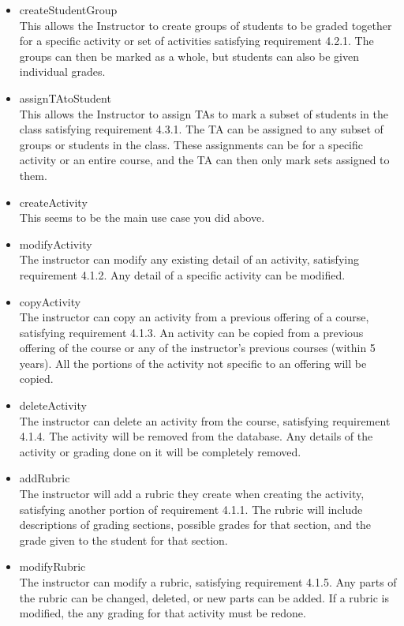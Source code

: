 \documentclass{article}
\begin{document}
\begin{itemize}
\item createStudentGroup \hfill \\
This allows the Instructor to create groups of students to be graded together for a specific activity or set of activities satisfying requirement 4.2.1. The groups can then be marked as a whole, but students can also be given individual grades.
\item assignTAtoStudent \hfill \\
This allows the Instructor to assign TAs to mark a subset of students in the class satisfying requirement 4.3.1. The TA can be assigned to any subset of groups or students in the class. These assignments can be for a specific activity or an entire course, and the TA can then only mark sets assigned to them.
\item createActivity \hfill \\
This seems to be the main use case you did above.
\item modifyActivity \hfill \\
The instructor can modify any existing detail of an activity, satisfying requirement 4.1.2. Any detail of a specific activity can be modified.
\item copyActivity \hfill \\
The instructor can copy an activity from a previous offering of a course, satisfying requirement 4.1.3. An activity can be copied from a previous offering of the course or any of the instructor’s previous courses (within 5 years). All the portions of the activity not specific to an offering will be copied.
\item deleteActivity \hfill \\
The instructor can delete an activity from the course, satisfying requirement 4.1.4. The activity will be removed from the database. Any details of the activity or grading done on it will be completely removed.
\item addRubric \hfill \\
The instructor will add a rubric they create when creating the activity, satisfying another portion of requirement 4.1.1. The rubric will include descriptions of grading sections, possible grades for that section, and the grade given to the student for that section.
\item modifyRubric \hfill \\
The instructor can modify a rubric, satisfying requirement 4.1.5. Any parts of the rubric can be changed, deleted, or new parts can be added. If a rubric is modified, the any grading for that activity must be redone.

\end{itemize}
\end{document}
